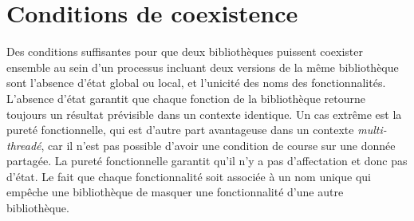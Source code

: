 




\section{Conditions de coexistence}
%
Des conditions suffisantes pour que deux bibliothèques puissent coexister
ensemble au sein d'un processus incluant deux versions de la même bibliothèque
sont l'absence d'état global ou local, et l'unicité des noms des
fonctionnalités.  L'absence d'état garantit que chaque fonction de la
bibliothèque retourne toujours un résultat prévisible dans un contexte
identique. Un cas extrême est la pureté fonctionnelle, qui est d'autre part
avantageuse dans un contexte \textit{multi-threadé}, car il n'est pas possible
d'avoir une condition de course sur une donnée partagée. La pureté
fonctionnelle garantit qu'il n'y a pas d'affectation et donc pas d'état.  Le
fait que chaque fonctionnalité soit associée à un nom unique qui empêche une
bibliothèque de masquer une fonctionnalité d'une autre bibliothèque.



